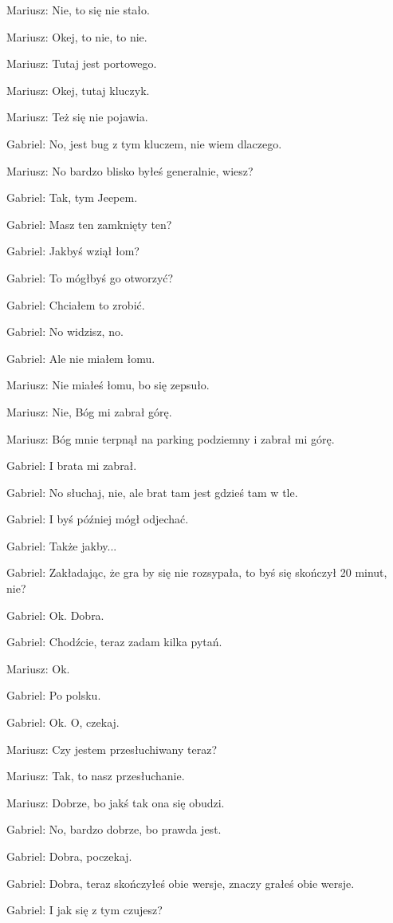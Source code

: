 Mariusz: Nie, to się nie stało.

Mariusz: Okej, to nie, to nie.

Mariusz: Tutaj jest portowego.

Mariusz: Okej, tutaj kluczyk.

Mariusz: Też się nie pojawia.

Gabriel: No, jest bug z tym kluczem, nie wiem dlaczego.

Mariusz: No bardzo blisko byłeś generalnie, wiesz?

Gabriel: Tak, tym Jeepem.

Gabriel: Masz ten zamknięty ten?

Gabriel: Jakbyś wziął łom?

Gabriel: To mógłbyś go otworzyć?

Gabriel: Chciałem to zrobić.

Gabriel: No widzisz, no.

Gabriel: Ale nie miałem łomu.

Mariusz: Nie miałeś łomu, bo się zepsuło.

Mariusz: Nie, Bóg mi zabrał górę.

Mariusz: Bóg mnie terpnął na parking podziemny i zabrał mi górę.

Gabriel: I brata mi zabrał.

Gabriel: No słuchaj, nie, ale brat tam jest gdzieś tam w tle.

Gabriel: I byś później mógł odjechać.

Gabriel: Także jakby...

Gabriel: Zakładając, że gra by się nie rozsypała, to byś się skończył 20 minut, nie?

Gabriel: Ok. Dobra.

Gabriel: Chodźcie, teraz zadam kilka pytań.

Mariusz: Ok.

Gabriel: Po polsku.

Gabriel: Ok. O, czekaj.

Mariusz: Czy jestem przesłuchiwany teraz?

Mariusz: Tak, to nasz przesłuchanie.

Mariusz: Dobrze, bo jakś tak ona się obudzi.

Gabriel: No, bardzo dobrze, bo prawda jest.

Gabriel: Dobra, poczekaj.

Gabriel: Dobra, teraz skończyłeś obie wersje, znaczy grałeś obie wersje.

Gabriel: I jak się z tym czujesz?

